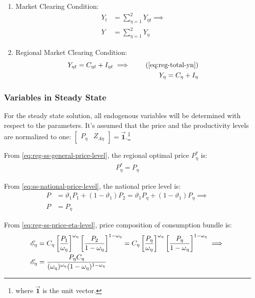 \documentclass[
thesis.tex
]{subfiles}
\begin{document}
\begin{enumerate}
	\item Market Clearing Condition:
	\begin{align}
		Y_t &= \sum_{\eta=1}^{2} Y_{\eta t} \implies \nonumber \\
		Y &= \sum_{\eta=1}^{2} Y_{\eta} \label{eq:reg-ss-market-clearing-condition}
	\end{align}

	\item Regional Market Clearing Condition:
	\begin{align}
		Y_{\eta t} = C_{\eta t} + I_{\eta t} \implies \tag{\ref{eq:reg-total-yn}} \\
		Y_{\eta} = C_{\eta} + I_{\eta} \label{eq:reg-ss-total-yn}
	\end{align}
	

\end{enumerate}


\subsubsection*{Variables in Steady State}


For the steady state solution, all endogenous variables will be determined with respect to the parameters. It's assumed that the price and the productivity levels are normalized to one: $\begin{bmatrix} P_\eta & Z_{A\eta} \end{bmatrix} = \vec{\bm{1}}$.\footnote{where $\vec{\bm{1}}$ is the unit vector.}

From \ref{eq:reg-ss-general-price-level}, the regional optimal price $P_{\eta}^\ast$ is:
\begin{align}
	P_{\eta}^\ast = P_{\eta}
\end{align}

From \ref{eq:ss-national-price-level}, the national price level is:
\begin{align}
	P &= \vartheta_1 P_{1} + (1 -\vartheta_1) P_{2} = \vartheta_1 P_{\eta} + (1 -\vartheta_1) P_{\eta} \implies \nonumber \\
	P &= P_{\eta}
\end{align}

From \ref{eq:reg-ss-price-eta-level}, price composition of consumption bundle is:
\begin{align}
	\te[] &= C_{\eta} \left[ \frac{P_{1}}{\omega_{\eta}} \right]^{\omega_{\eta}} \left[ \frac{P_{2}}{1 -\omega_{\eta}} \right]^{1 -\omega_{\eta}} = C_{\eta} \left[ \frac{P_{\eta}}{\omega_{\eta}} \right]^{\omega_{\eta}} \left[ \frac{P_{\eta}}{1 -\omega_{\eta}} \right]^{1 -\omega_{\eta}} \implies \nonumber \\
	\te[] &= \frac{P_{\eta} C_{\eta}}{(\omega_{\eta})^{\omega_{\eta}} (1 -\omega_{\eta})^{1 -\omega_{\eta}} } \label{eq:reg-ss-te}
\end{align}
\end{document}
